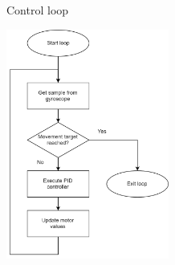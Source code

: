 \documentclass{beamer}
\begin{document}
\begin{frame}{Control loop}
\begin{center}
	\includegraphics[width=0.4\textwidth]{pics/Flowchart_code.png}
\end{center}
\end{frame}
\end{document}
